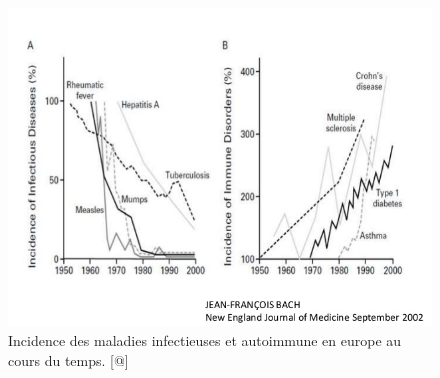 \documentclass[12pt,a4paper]{article}
\begin{document}
\begin{figure}[ht]
\begin{center}
\includegraphics[scale=0.5]{img/allergie_infection.jpg}\hfill
\end{center}
\caption{Incidence des maladies infectieuses et autoimmune en europe au cours du temps. [@]}
\label{hyigienisme}
\end{figure}
\end{document}
